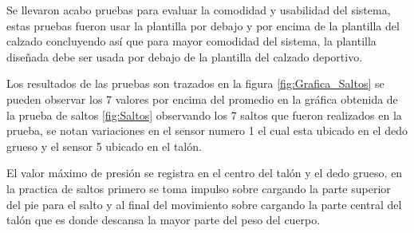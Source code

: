 Se llevaron acabo pruebas para evaluar la comodidad y usabilidad del sistema, estas pruebas fueron usar la plantilla por debajo y por encima de la plantilla del calzado concluyendo así que para mayor comodidad del sistema, la plantilla diseñada debe ser usada por debajo de la plantilla del calzado deportivo.

Los resultados de las pruebas son trazados en la figura \ref{fig:Grafica_Saltos} se pueden observar los 7 valores por encima del promedio en la gráfica obtenida de la prueba de saltos \ref{fig:Saltos} observando los 7 saltos que fueron realizados en la prueba, se notan variaciones en el sensor numero 1 el cual esta ubicado en el dedo grueso y el sensor 5 ubicado en el talón.

El valor máximo de presión se registra en el centro del talón y el dedo grueso, en la practica de saltos primero se toma impulso sobre cargando la parte superior del pie para el salto y al final del movimiento sobre cargando la parte central del talón que es donde descansa la mayor parte del peso del cuerpo.




